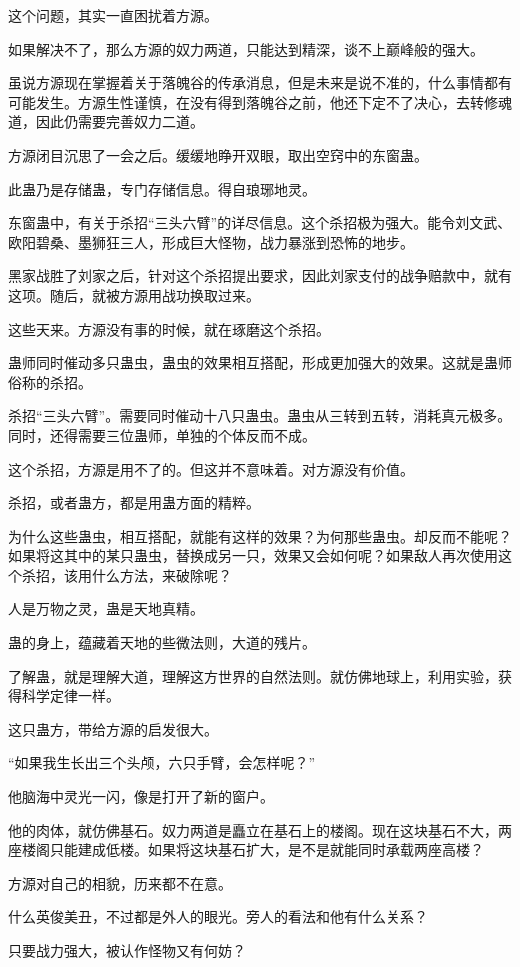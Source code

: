 \begin{this_body}
这个问题，其实一直困扰着方源。

如果解决不了，那么方源的奴力两道，只能达到精深，谈不上巅峰般的强大。

虽说方源现在掌握着关于落魄谷的传承消息，但是未来是说不准的，什么事情都有可能发生。方源生性谨慎，在没有得到落魄谷之前，他还下定不了决心，去转修魂道，因此仍需要完善奴力二道。

方源闭目沉思了一会之后。缓缓地睁开双眼，取出空窍中的东窗蛊。

此蛊乃是存储蛊，专门存储信息。得自琅琊地灵。

东窗蛊中，有关于杀招“三头六臂”的详尽信息。这个杀招极为强大。能令刘文武、欧阳碧桑、墨狮狂三人，形成巨大怪物，战力暴涨到恐怖的地步。

黑家战胜了刘家之后，针对这个杀招提出要求，因此刘家支付的战争赔款中，就有这项。随后，就被方源用战功换取过来。

这些天来。方源没有事的时候，就在琢磨这个杀招。

蛊师同时催动多只蛊虫，蛊虫的效果相互搭配，形成更加强大的效果。这就是蛊师俗称的杀招。

杀招“三头六臂”。需要同时催动十八只蛊虫。蛊虫从三转到五转，消耗真元极多。同时，还得需要三位蛊师，单独的个体反而不成。

这个杀招，方源是用不了的。但这并不意味着。对方源没有价值。

杀招，或者蛊方，都是用蛊方面的精粹。

为什么这些蛊虫，相互搭配，就能有这样的效果？为何那些蛊虫。却反而不能呢？如果将这其中的某只蛊虫，替换成另一只，效果又会如何呢？如果敌人再次使用这个杀招，该用什么方法，来破除呢？

人是万物之灵，蛊是天地真精。

蛊的身上，蕴藏着天地的些微法则，大道的残片。

了解蛊，就是理解大道，理解这方世界的自然法则。就仿佛地球上，利用实验，获得科学定律一样。

这只蛊方，带给方源的启发很大。

“如果我生长出三个头颅，六只手臂，会怎样呢？”

他脑海中灵光一闪，像是打开了新的窗户。

他的肉体，就仿佛基石。奴力两道是矗立在基石上的楼阁。现在这块基石不大，两座楼阁只能建成低楼。如果将这块基石扩大，是不是就能同时承载两座高楼？

方源对自己的相貌，历来都不在意。

什么英俊美丑，不过都是外人的眼光。旁人的看法和他有什么关系？

只要战力强大，被认作怪物又有何妨？


\end{this_body}
